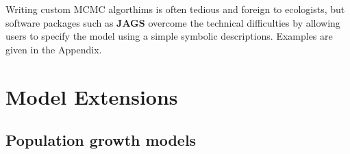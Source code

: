 \documentclass[12pt]{article}
\begin{document}
Writing custom MCMC algorthims is often tedious and foreign to
ecologists, but software packages such as %
\textbf{JAGS} \citep{plummer:2003} overcome the technical 
difficulties by allowing users to specify the model using a simple symbolic 
descriptions. Examples are given in the Appendix.




\section{Model Extensions}
\label{sec:ext}

\subsection{Population growth models}

\end{document}
